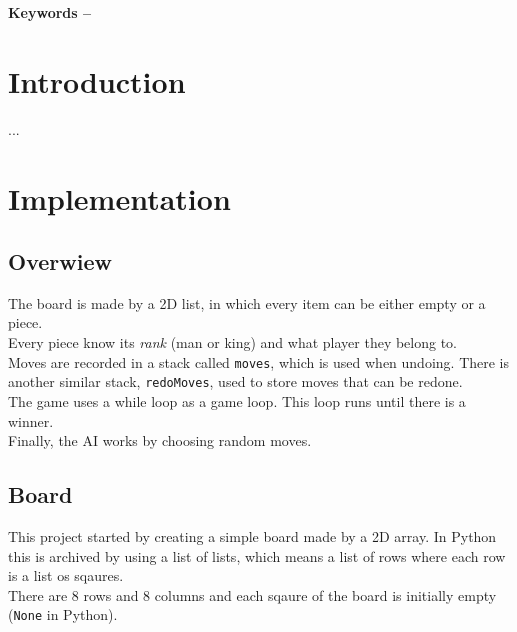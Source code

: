 \documentclass[10pt, a4paper]{article}
\title{\mytitle}
\author{\myauthor\hspace{1em}\\\contact\\Edinburgh Napier University\hspace{0.5em}-\hspace{0.5em}\mymodule}
\date{}
\begin{document}
    \maketitle
    \begin{abstract}
        The goal of this coursework is to implement the classic board game of checkers in an arbitrary computer language demonstrating a correct use of data structures. The language chosen here is Python and the game can be played from the console.
    \end{abstract}
    
    \textbf{Keywords -- }{\mykeywords}
    
    \section{Introduction}
    ...
       
    \section{Implementation}
    
    \subsection{Overwiew}
    The board is made by a 2D list, in which every item can be either empty or a piece. \\
    Every piece know its \textit{rank} (man or king) and what player they belong to. \\
    Moves are recorded in a stack called \texttt{moves}, which is used when undoing. There is another similar stack, \texttt{redoMoves}, used to store moves that can be redone. \\
    The game uses a while loop as a game loop. This loop runs until there is a winner. \\
    Finally, the AI works by choosing random moves.
    
    \subsection{Board}
    This project started by creating a simple board made by a 2D array. In Python this is archived by using a list of lists, which means a list of rows where each row is a list os sqaures. \\
    There are 8 rows and 8 columns and each sqaure of the board is initially empty (\texttt{None} in Python).
    
\end{document}
